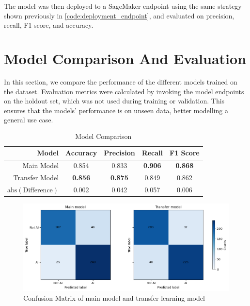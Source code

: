 The model was then deployed to a SageMaker endpoint using the same strategy shown previously in \cref{code:deployment_endpoint}, and evaluated on precision, recall, F1 score, and accuracy.

\newpage

\section{Model Comparison And Evaluation}

In this section, we compare the performance of the different models trained on the dataset. Evaluation metrics were calculated by invoking the model endpoints on the holdout set, which was not used during training or validation. This ensures that the models' performance is on unseen data, better modelling a general use case.

\begin{table}[h]
\centering
\caption{Model Comparison}
\begin{tabular}{rcccc}
\toprule
\textbf{Model} & \textbf{Accuracy} & \textbf{Precision} & \textbf{Recall} & \textbf{F1 Score} \\
\midrule
Main Model     & 0.854          & 0.833          & \textbf{0.906} & \textbf{0.868} \\
Transfer Model & \textbf{0.856} & \textbf{0.875} & 0.849 & 0.862 \\
\midrule
$\text{abs}(\text{Difference}) $ & 0.002 & 0.042 & 0.057 & 0.006 \\
\bottomrule
\end{tabular}
\label{tab:model_comparison}
\end{table}

\begin{figure}[h]
    \centering
    \includegraphics[width=0.8\linewidth]{figures/confusion_matrix.png} %
    \centering
    \caption{Confusion Matrix of main model and transfer learning model} %
    \label{fig:confusion_matrixes} %
\end{figure}

